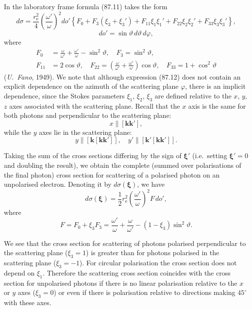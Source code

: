 
In the laboratory frame formula (87.11) takes the form
\begin{equation}
d\sigma = \frac{r_\mathrm{e}^2}{4}\left(\frac{\omega'}{\omega}\right)^{\!2}do'\left\{F_0 + F_3(\xi_3 + \xi_3') + F_{11}\xi_1\xi_1' + F_{22}\xi_2\xi_2' + F_{33}\xi_3\xi_3'\right\},
\label{eq:87.12}
\end{equation}
\[
do' = \sin\vartheta\,d\vartheta\,d\varphi,
\]
where
\begin{equation}
\begin{aligned}
F_0 &= \frac{\omega}{\omega'} + \frac{\omega'}{\omega} - \sin^2\vartheta, \quad F_3 = \sin^2\vartheta, \\
F_{11} &= 2\cos\vartheta, \quad F_{22} = \left(\frac{\omega}{\omega'} + \frac{\omega'}{\omega}\right)\cos\vartheta, \quad F_{33} = 1 + \cos^2\vartheta
\end{aligned}
\label{eq:87.13}
\end{equation}
(\emph{U.~Fano}, 1949). We note that although expression (87.12) does not contain an explicit dependence on the azimuth of the scattering plane $\varphi$, there is an implicit dependence, since the Stokes parameters $\xi_1$, $\xi_2$, $\xi_3$ are defined relative to the $x$, $y$, $z$ axes associated with the scattering plane. Recall that the $x$ axis is the same for both photons and perpendicular to the scattering plane:
\[
x \parallel [\mathbf{kk}'],
\]
while the $y$ axes lie in the scattering plane:
\[
y \parallel [\mathbf{k}[\mathbf{kk}']],\quad y' \parallel [\mathbf{k}'[\mathbf{kk}']].
\]

Taking the sum of the cross sections differing by the sign of $\boldsymbol{\xi}'$ (i.e.\ setting $\boldsymbol{\xi}' = 0$ and doubling the result), we obtain the complete (summed over polarisations of the final photon) cross section for scattering of a polarised photon on an unpolarised electron. Denoting it by $d\sigma(\boldsymbol{\xi})$, we have
\begin{equation}
d\sigma(\boldsymbol{\xi}) = \frac{1}{2}r_\mathrm{e}^2\left(\frac{\omega'}{\omega}\right)^{\!2}F\,do',
\label{eq:87.14}
\end{equation}
where
\begin{equation}
F = F_0 + \xi_3 F_3 = \frac{\omega'}{\omega} + \frac{\omega}{\omega'} - (1-\xi_3)\sin^2\vartheta.
\label{eq:87.15}
\end{equation}

We see that the cross section for scattering of photons polarised perpendicular to the scattering plane ($\xi_3 = 1$) is greater than for photons polarised in the scattering plane ($\xi_3 = -1$). For circular polarisation the cross section does not depend on $\xi_1$. Therefore the scattering cross section coincides with the cross section for unpolarised photons if there is no linear polarisation relative to the $x$ or $y$ axes ($\xi_3 = 0$) or even if there is polarisation relative to directions making $45^\circ$ with these axes.

